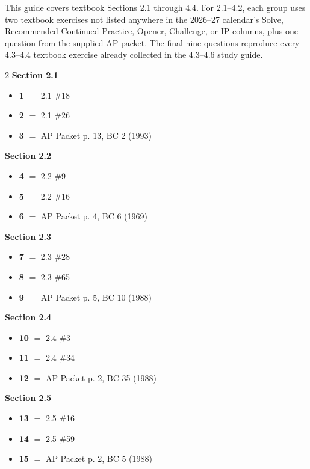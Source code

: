 \documentclass[11pt]{article}
\begin{document}
\medskip
\noindent This guide covers textbook Sections 2.1 through 4.4. For 2.1--4.2, each group uses two textbook exercises not listed anywhere in the 2026--27 calendar's Solve, Recommended Continued Practice, Opener, Challenge, or IP columns, plus one question from the supplied AP packet. The final nine questions reproduce every 4.3--4.4 textbook exercise already collected in the 4.3--4.6 study guide.
\medskip
\begin{multicols}{2}
\noindent\textbf{Section 2.1}
\begin{itemize}[leftmargin=1.5em,itemsep=1pt,topsep=2pt]
\item[] \textbf{1} $=$ 2.1 \#18
\item[] \textbf{2} $=$ 2.1 \#26
\item[] \textbf{3} $=$ AP Packet p. 13, BC 2 (1993)
\end{itemize}
\smallskip
\noindent\textbf{Section 2.2}
\begin{itemize}[leftmargin=1.5em,itemsep=1pt,topsep=2pt]
\item[] \textbf{4} $=$ 2.2 \#9
\item[] \textbf{5} $=$ 2.2 \#16
\item[] \textbf{6} $=$ AP Packet p. 4, BC 6 (1969)
\end{itemize}
\smallskip
\noindent\textbf{Section 2.3}
\begin{itemize}[leftmargin=1.5em,itemsep=1pt,topsep=2pt]
\item[] \textbf{7} $=$ 2.3 \#28
\item[] \textbf{8} $=$ 2.3 \#65
\item[] \textbf{9} $=$ AP Packet p. 5, BC 10 (1988)
\end{itemize}
\smallskip
\noindent\textbf{Section 2.4}
\begin{itemize}[leftmargin=1.5em,itemsep=1pt,topsep=2pt]
\item[] \textbf{10} $=$ 2.4 \#3
\item[] \textbf{11} $=$ 2.4 \#34
\item[] \textbf{12} $=$ AP Packet p. 2, BC 35 (1988)
\end{itemize}
\smallskip
\noindent\textbf{Section 2.5}
\begin{itemize}[leftmargin=1.5em,itemsep=1pt,topsep=2pt]
\item[] \textbf{13} $=$ 2.5 \#16
\item[] \textbf{14} $=$ 2.5 \#59
\item[] \textbf{15} $=$ AP Packet p. 2, BC 5 (1988)
\end{itemize}

\end{multicols}
\end{document}
